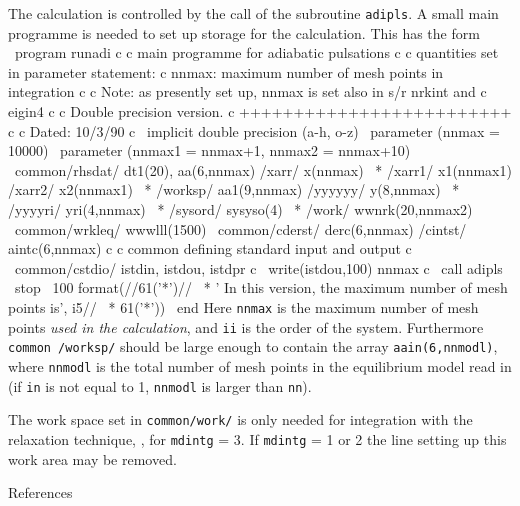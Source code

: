 The calculation is controlled by the call of the subroutine {\tt adipls}. 
A small main programme is needed to set up storage for the calculation.
This has the form
\ms
{\source
\obeyspaces
\     program runadi
c
c  main programme for adiabatic pulsations
c
c  quantities set in parameter statement:
c  nnmax: maximum number of mesh points in integration
c
c  Note: as presently set up, nnmax is set also in s/r nrkint and
c  eigin4
c
c  Double precision version.
c  +++++++++++++++++++++++++
c
c  Dated: 10/3/90
c
\      implicit double precision (a-h, o-z)
\      parameter (nnmax = 10000)
\      parameter (nnmax1 = nnmax+1, nnmax2 = nnmax+10)
\      common/rhsdat/ dt1(20), aa(6,nnmax) /xarr/ x(nnmax)
\     *  /xarr1/ x1(nnmax1) /xarr2/ x2(nnmax1)
\     *  /worksp/ aa1(9,nnmax)   /yyyyyy/ y(8,nnmax)  
\     *  /yyyyri/ yri(4,nnmax)
\     *  /sysord/ sysyso(4)
\     *  /work/ wwnrk(20,nnmax2)
\      common/wrkleq/ wwwlll(1500)
\      common/cderst/ derc(6,nnmax)  /cintst/ aintc(6,nnmax)
c
c  common defining standard input and output
c
\      common/cstdio/ istdin, istdou, istdpr
c
\      write(istdou,100) nnmax
c
\      call adipls
\      stop
\        100 format(//61('*')//
\     * ' In this version, the maximum number of mesh points is', i5//
\     * 61('*'))
\      end
}
\msni
Here {\tt nnmax} is the maximum number of mesh points 
{\it used in the calculation},
and {\tt ii} is the order of the system. Furthermore {\tt common /worksp/}
should be large enough to contain the array {\tt aain(6,nnmodl)},
where {\tt nnmodl} is the total number of mesh points in the 
equilibrium model read in (if {\tt in} is not equal to 1, {\tt nnmodl} is
larger than {\tt nn}).

The work space set in {\tt common/work/} is only needed
for integration with the relaxation technique, {\ie},
for {\tt mdintg} = 3.
If {\tt mdintg} = 1 or 2 the line setting up this work area may be removed.

\mainsect
\centerline{\twelvebf References} 

